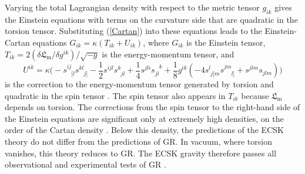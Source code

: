\documentclass[prd,onecolumn,nofootinbib,showpacs]{revtex4}
\begin{document}
Varying the total Lagrangian density with respect to the metric tensor $g_{ik}$ gives the Einstein equations with terms on the curvature side that are quadratic in the torsion tensor.
Substituting (\ref{Cartan}) into these equations leads to the Einstein-Cartan equations $G_{ik}=\kappa(T_{ik}+U_{ik})$, where $G_{ik}$ is the Einstein tensor, $T_{ik}=2(\delta\mathfrak{L}_\textrm{m}/\delta g^{ik})/\sqrt{-g}$ is the energy-momentum tensor, and
\begin{equation}
U^{ik}=\kappa\biggl(-s^{ij}_{\phantom{ij}[l}s^{kl}_{\phantom{kl}j]}-\frac{1}{2}s^{ijl}s^k_{\phantom{k}jl}+\frac{1}{4}s^{jli}s_{jl}^{\phantom{jl}k}+\frac{1}{8}g^{ik}(-4s^l_{\phantom{l}j[m}s^{jm}_{\phantom{jm}l]}+s^{jlm}s_{jlm})\biggr)
\label{Einstein}
\end{equation}
is the correction to the energy-momentum tensor generated by torsion and quadratic in the spin tensor \cite{Hehl}.
The spin tensor also appears in $T_{ik}$ because $\mathfrak{L}_\textrm{m}$ depends on torsion.
The corrections from the spin tensor to the right-hand side of the Einstein equations are significant only at extremely high densities, on the order of the Cartan density \cite{non}.
Below this density, the predictions of the ECSK theory do not differ from the predictions of GR.
In vacuum, where torsion vanishes, this theory reduces to GR.
The ECSK gravity therefore passes all observational and experimental tests of GR \cite{Hehl}.
\end{document}
